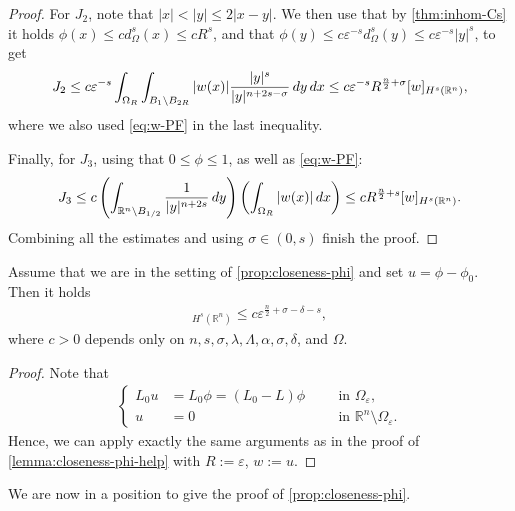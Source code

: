 \documentclass[11pt,reqno]{amsart}
\theoremstyle{plain}
\theoremstyle{definition}
\numberwithin{equation}{section}
\newcommand{\R}{\mathbb{R}}
\newcommand{\eps}{\varepsilon}
\newcommand{\1}{\mathbbm{1}}
\renewcommand{\d}{\textnormal{\,d}}
\begin{document}
\begin{proof}
    For $J_2$, note that $|x| <|y| \leq 2|x-y|$. We then use that by \autoref{thm:inhom-Cs} it holds $\phi(x) \le c d_{\Omega}^s(x)\le c R^s$, and that $\phi(y) \leq c \eps^{-s} d^s_{\Omega}(y) \le c \eps^{-s}|y|^s$, to get
    \begin{align*}
        J_2 \le c \eps^{-s} \int_{\Omega_R} \int_{B_1 \setminus B_{2R}} |w(x)| \frac{|y|^s}{|y|^{n+2s-\sigma}} \d y \d x \le c \eps^{-s} R^{\frac{n}{2} + \sigma} [w]_{H^s(\R^n)},
    \end{align*}
    where we also used \eqref{eq:w-PF} in the last inequality.

Finally, for $J_3$, using that $0 \le \phi \le 1$, as well as \eqref{eq:w-PF}:
\begin{align*}
J_3 \le c \left( \int_{\R^n \setminus B_{1/2}} \frac{1}{|y|^{n+2s}} \d y \right) \left( \int_{\Omega_{R}} |w(x)| \d x \right) \leq cR^{\frac{n}{2}+s}[w]_{H^s(\R^n)}.
\end{align*}
Combining all the estimates and using $\sigma \in (0,s)$ finish the proof.
\end{proof}

\begin{lemma}
\label{lemma:closeness-phi-help-2}
Assume that we are in the setting of \autoref{prop:closeness-phi} and set $u = \phi - \phi_0$. Then it holds
\begin{align*}
    [u]_{H^s(\R^n)}\le c \eps^{\frac{n}{2} + \sigma - \delta -s},
\end{align*}
where $c > 0$ depends only on $n,s,\sigma,\lambda,\Lambda,\alpha,\sigma,\delta$, and $\Omega$.
\end{lemma}

\begin{proof}
Note that
\begin{align*}
\left\{
\begin{aligned}
    L_0 u &= L_0 \phi = (L_0 - L) \phi ~~ &&\text{ in } \Omega_{\eps},\\
    u &= 0 ~~ &&\text{ in } \R^n \setminus \Omega_\varepsilon.
\end{aligned}
\right.
\end{align*}
Hence, we can apply exactly the same arguments as in the proof of \autoref{lemma:closeness-phi-help} with $R := \eps$, $w := u$.
\end{proof}



We are now in a position to give the proof of \autoref{prop:closeness-phi}.
\end{document}
